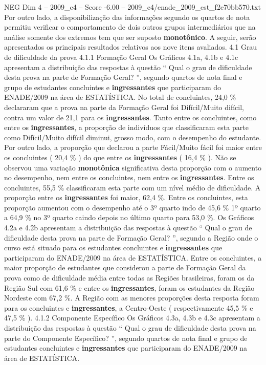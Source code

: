 \begin{textsample}{NEG Dim 4 – 2009\_c4 – Score -6.00 – 2009\_c4/enade\_2009\_est\_f2e70bb570.txt}
Por outro lado, a disponibilização das informações segundo os quartos de nota permitiu verificar o comportamento de dois outros grupos intermediários que na análise somente dos extremos tem que ser suposto \textbf{monotônico}.
A seguir, serão apresentados os principais resultados relativos aos nove itens avaliados. 4.1 Grau de dificuldade da prova 4.1.1 Formação Geral Os Gráficos 4.1a, 4.1b e 4.1c apresentam a distribuição das respostas à questão “ Qual o grau de dificuldade desta prova na parte de Formação Geral? ”, segundo quartos de nota final e grupo de estudantes concluintes e \textbf{ingressantes} que participaram do ENADE/2009 na área de ESTATÍSTICA.
No total de concluintes, 24,0 \% declararam que a prova na parte da Formação Geral foi Difícil/Muito difícil, contra um valor de 21,1 para os \textbf{ingressantes}.
Tanto entre os concluintes, como entre os \textbf{ingressantes}, a proporção de indivíduos que classificaram esta parte como Difícil/Muito difícil diminui, grosso modo, com o desempenho do estudante.
Por outro lado, a proporção que declarou a parte Fácil/Muito fácil foi maior entre os concluintes ( 20,4 \% ) do que entre os \textbf{ingressantes} ( 16,4 \% ).
Não se observou uma variação \textbf{monotônica} significativa desta proporção com o aumento no desempenho, nem entre os concluintes, nem entre os \textbf{ingressantes}.
Entre os concluintes, 55,5 \% classificaram esta parte com um nível médio de dificuldade.
A proporção entre os \textbf{ingressantes} foi maior, 62,4 \%.
Entre os concluintes, esta proporção aumentou com o desempenho até o 3º quarto indo de 45,6 \% 1º quarto a 64,9 \% no 3º quarto caindo depois no último quarto para 53,0 \%.
Os Gráficos 4.2a e 4.2b apresentam a distribuição das respostas à questão “ Qual o grau de dificuldade desta prova na parte de Formação Geral? ”, segundo a Região onde o curso está situado para os estudantes concluintes e \textbf{ingressantes} que participaram do ENADE/2009 na área de ESTATÍSTICA.
Entre os concluintes, a maior proporção de estudantes que considerou a parte de Formação Geral da prova como de dificuldade média entre todas as Regiões brasileiras, foram os da Região Sul com 61,6 \% e entre os \textbf{ingressantes}, foram os estudantes da Região Nordeste com 67,2 \%.
A Região com as menores proporções desta resposta foram para os concluintes e \textbf{ingressantes}, a Centro-Oeste ( respectivamente 45,5 \% e 47,5 \% ). 4.1.2 Componente Específico Os Gráficos 4.3a, 4.3b e 4.3c apresentam a distribuição das respostas à questão “ Qual o grau de dificuldade desta prova na parte do Componente Específico? ”, segundo quartos de nota final e grupo de estudantes concluintes e \textbf{ingressantes} que participaram do ENADE/2009 na área de ESTATÍSTICA.

\end{textsample}
